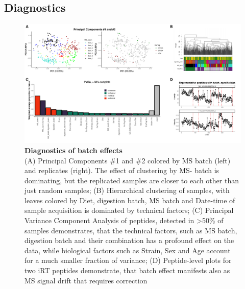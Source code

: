 \documentclass[num-refs]{wiley-article}
\begin{document}
\subsection{Diagnostics}

\begin{figure}[hbt]
	\includegraphics[width=\textwidth]{figures/Fig2_diagnostics.pdf}
	
	\caption{\textbf{Diagnostics of batch effects}  \\
		\footnotesize
		(A) Principal Components \#1 and \#2 colored by MS batch (left) and replicates (right). The effect of clustering by MS- batch is dominating, but the replicated samples are closer to each other than just random samples; (B) Hierarchical clustering of samples, with leaves colored by Diet, digestion batch, MS batch and Date-time of sample acquisition is dominated by technical factors; (C) Principal Variance Component Analysis of peptides, detected in >50\% of samples demonstrates, that the technical factors, such as MS batch, digestion batch and their combination has a profound effect on the data, while biological factors such as Strain, Sex and Age account for a much smaller fraction of variance; (D) Peptide-level plots for two iRT peptides demonstrate, that batch effect manifests also as MS signal drift that requires correction}
	\label{fig:batch_fig3_diagnostics}
\end{figure}
\end{document}
